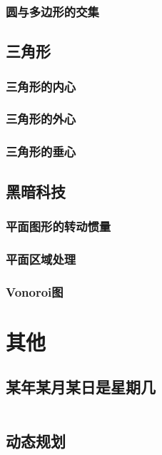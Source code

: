 \documentclass[a4paper]{article}
\newcommand{\cppcode}[1]{
    \inputminted[mathescape]{cpp}{source/#1}
}
\begin{document}
\subsubsection{圆与多边形的交集}

\subsection{三角形}

\subsubsection{三角形的内心}

\subsubsection{三角形的外心}

\subsubsection{三角形的垂心}

\subsection{黑暗科技}

\subsubsection{平面图形的转动惯量}

\subsubsection{平面区域处理}

\subsubsection{Vonoroi图}

\section{其他}

\subsection{某年某月某日是星期几}

\cppcode{miscellany/what-day-is-today.cpp}

\subsection{动态规划}
\end{document}
